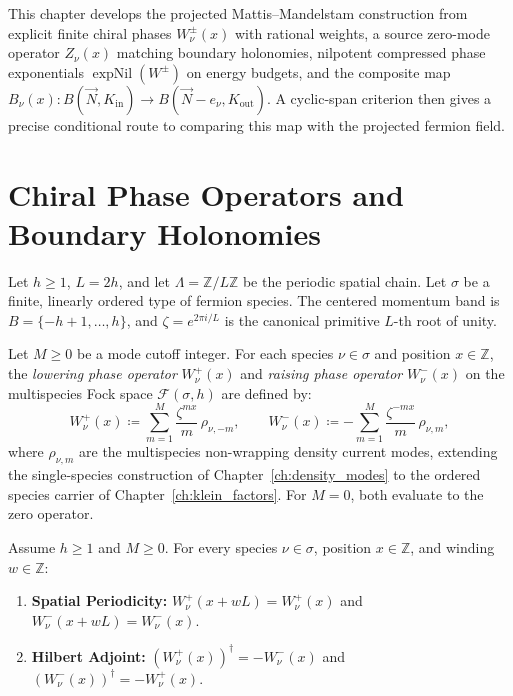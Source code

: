 This chapter develops the projected Mattis--Mandelstam construction from explicit finite chiral phases $W^\pm_\nu(x)$ with rational weights, a source zero-mode operator $Z_\nu(x)$ matching boundary holonomies, nilpotent compressed phase exponentials $\operatorname{expNil}(W^\pm)$ on energy budgets, and the composite map $B_\nu(x): B(\vec{N}, K_{\mathrm{in}}) \to B(\vec{N}-e_\nu, K_{\mathrm{out}})$. A cyclic-span criterion then gives a precise conditional route to comparing this map with the projected fermion field.

\section{Chiral Phase Operators and Boundary Holonomies}

Let $h \ge 1$, $L = 2h$, and let $\Lambda = \mathbb{Z}/L\mathbb{Z}$ be the periodic spatial chain. Let $\sigma$ be a finite, linearly ordered type of fermion species. The centered momentum band is $B = \{-h+1, \dots, h\}$, and $\zeta = e^{2\pi i / L}$ is the canonical primitive $L$-th root of unity.

\begin{definition}
\label{def:chiral_phases}
Let $M \ge 0$ be a mode cutoff integer. For each species $\nu \in \sigma$ and position $x \in \mathbb{Z}$, the \emph{lowering phase operator} $W^+_\nu(x)$ and \emph{raising phase operator} $W^-_\nu(x)$ on the multispecies Fock space $\mathcal{F}(\sigma, h)$ are defined by:
\begin{equation}
\label{eq:w_plus_minus_def}
W^+_\nu(x) \coloneqq \sum_{m=1}^M \frac{\zeta^{m x}}{m}\, \rho_{\nu, -m}, \qquad W^-_\nu(x) \coloneqq -\sum_{m=1}^M \frac{\zeta^{-m x}}{m}\, \rho_{\nu, m},
\end{equation}
where $\rho_{\nu, m}$ are the multispecies non-wrapping density current modes, extending the single-species construction of Chapter~\ref{ch:density_modes} to the ordered species carrier of Chapter~\ref{ch:klein_factors}. For $M = 0$, both evaluate to the zero operator.
\end{definition}

\begin{lemma}
\label{lem:phase_properties}
Assume $h \ge 1$ and $M \ge 0$. For every species $\nu \in \sigma$, position $x \in \mathbb{Z}$, and winding $w \in \mathbb{Z}$:
\begin{enumerate}
    \item \textbf{Spatial Periodicity:} $W^+_\nu(x + w L) = W^+_\nu(x)$ and $W^-_\nu(x + w L) = W^-_\nu(x)$.
    \item \textbf{Hilbert Adjoint:} $(W^+_\nu(x))^\dagger = -W^-_\nu(x)$ and $(W^-_\nu(x))^\dagger = -W^+_\nu(x)$.
\end{enumerate}
\end{lemma}


